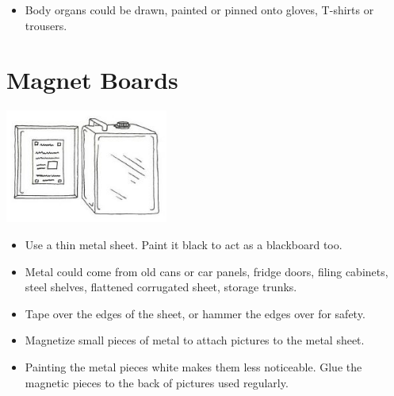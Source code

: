\begin{multicols}{2}
\begin{itemize}
\item Body organs could be drawn,
painted or pinned onto gloves,
T-shirts or trousers.
\end{itemize}


\section{Magnet Boards}

\begin{center}
\includegraphics[width=0.4\textwidth]{./img/vso/magnet-board.jpg}
\end{center}

\begin{itemize}
\item Use a thin metal sheet. Paint it black to act as a blackboard too.
\item Metal could come from old cans or car panels, fridge doors, filing
cabinets, steel shelves, flattened corrugated sheet, storage trunks.
\item Tape over the edges of the sheet, or hammer the edges over for
safety.
\item Magnetize small pieces of metal to attach pictures to
the metal sheet.
\item Painting the metal pieces white makes them less noticeable. Glue the
magnetic pieces to the back of pictures used regularly.
\end{itemize}


\end{multicols}